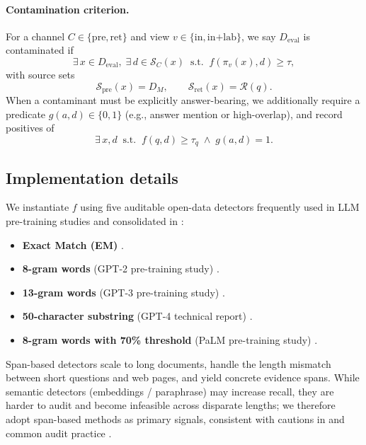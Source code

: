 \paragraph{Contamination criterion.}
For a channel $C\in\{\text{pre},\text{ret}\}$ and view $v\in\{\text{in},\text{in+lab}\}$, we say $D_{\text{eval}}$ is contaminated if
\begin{equation}
\exists\, x\in D_{\text{eval}},\; \exists\, d\in \mathcal{S}_C(x) \;\; \text{s.t.} \;\; f\!\left(\pi_v(x), d\right) \ge \tau,
\label{eq:unified}
\end{equation}
with source sets
\[
\mathcal{S}_{\text{pre}}(x)=D_M, \qquad \mathcal{S}_{\text{ret}}(x)=\mathcal{R}(q).
\]
When a contaminant must be explicitly answer-bearing, we additionally require a predicate $g(a,d)\in\{0,1\}$ (e.g., answer mention or high-overlap), and record positives of
\begin{equation}
\exists\, x, d \;\; \text{s.t.} \;\; f(q,d)\ge \tau_q \;\wedge\; g(a,d)=1.
\label{eq:answer-bearing}
\end{equation}







\subsection{Implementation details}

We instantiate $f$ using five auditable open-data detectors frequently used in LLM pre-training studies and consolidated in \cite{ravautComprehensiveSurveyContamination2025a}:
\begin{itemize}
\item \textbf{Exact Match (EM)} \cite{dodgeDocumentingLargeWebtext2021}.
\item \textbf{8-gram words} (GPT-2 pre-training study) \cite{radfordLanguageModelsAre}.
\item \textbf{13-gram words} (GPT-3 pre-training study) \cite{brownLanguageModelsAre2020}.
\item \textbf{50-character substring} (GPT-4 technical report) \cite{openaiGPT4TechnicalReport2024}.
\item \textbf{8-gram words with 70\% threshold} (PaLM pre-training study) \cite{chowdheryPaLMScalingLanguage2022}.
\end{itemize}
Span-based detectors scale to long documents, handle the length mismatch between short questions and web pages, and yield concrete evidence spans. While semantic detectors (embeddings / paraphrase) may increase recall, they are harder to audit and become infeasible across disparate lengths; we therefore adopt span-based methods as primary signals, consistent with cautions in \cite{liuLanguageModelsMay2025} and common audit practice \cite{ravautComprehensiveSurveyContamination2025a}.

